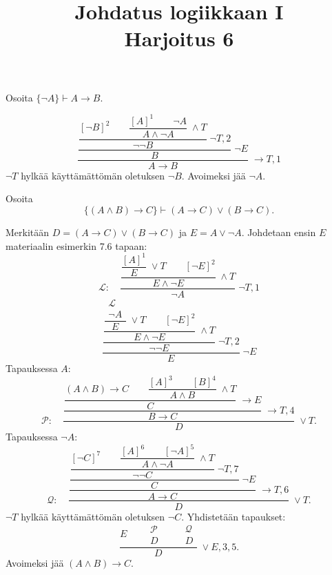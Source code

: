 \documentclass[11pt,a4paper]{amsart}
\title{Johdatus logiikkaan I\\Harjoitus 6}
\author{}
\date{}
\begin{document}

\begin{exercise}
  Osoita \(\{\neg A\} \vdash A \to B\).
\end{exercise}

\begin{solution}
  \[
    \dfrac{
      \dfrac{
        \dfrac{[\neg B]^2\qquad
        \dfrac{[A]^1\qquad\neg A}{A\land\neg A}\;\land T}
        {\neg\neg B}\;\neg T,2
      }{B}\;\neg E
    }{A\to B}\;\to T,1
  \]
  \(\neg T\) hylkää käyttämättömän oletuksen \(\neg B\).
  Avoimeksi jää \(\neg A\).
\end{solution}

\begin{exercise}
  Osoita
  \[
    \{(A \land B) \to C\} \vdash (A \to C) \lor (B \to C).
  \]
\end{exercise}

\begin{solution}
  Merkitään \(D=(A\to C)\lor(B\to C)\) ja \(E=A\lor\neg A\).
  Johdetaan ensin \(E\) materiaalin esimerkin 7.6 tapaan:
  \[
    \mathcal L:\quad
    \dfrac{
      \dfrac{\dfrac{[A]^1}{E}\;\lor T\qquad[\neg E]^2}
      {E\land\neg E}\;\land T
    }{\neg A}\;\neg T,1
  \]
  \[
    \dfrac{
      \dfrac{
        \dfrac{
          \dfrac{
            \begin{array}{c}\mathcal L\\\neg A
          \end{array}}{E}\;\lor T
          \qquad[\neg E]^2
        }{E\land\neg E}\;\land T
      }{\neg\neg E}\;\neg T,2
    }{E}\;\neg E
  \]
  Tapauksessa \(A\):
  \[
    \mathcal P:\quad
    \dfrac{
      \dfrac{
        \dfrac{(A\land B)\to C\qquad
        \dfrac{[A]^3\qquad[B]^4}{A\land B}\;\land T}
        {C}\;\to E
      }{B\to C}\;\to T,4
    }{D}\;\lor T.
  \]
  Tapauksessa \(\neg A\):
  \[
    \mathcal Q:\quad
    \dfrac{
      \dfrac{
        \dfrac{
          \dfrac{[\neg C]^7\qquad
            \dfrac{[A]^6\qquad[\neg A]^5}
          {A\land\neg A}\;\land T}
          {\neg\neg C}\;\neg T,7
        }{C}\;\neg E
      }{A\to C}\;\to T,6
    }{D}\;\lor T.
  \]
  \(\neg T\) hylkää käyttämättömän oletuksen \(\neg C\).
  Yhdistetään tapaukset:
  \[
    \dfrac{
      E\qquad
      \begin{array}{c}\mathcal P\\D
      \end{array}\qquad
      \begin{array}{c}\mathcal Q\\D
      \end{array}
    }{D}\;\lor E,3,5.
  \]
  Avoimeksi jää \((A\land B)\to C\).
\end{solution}
\end{document}
